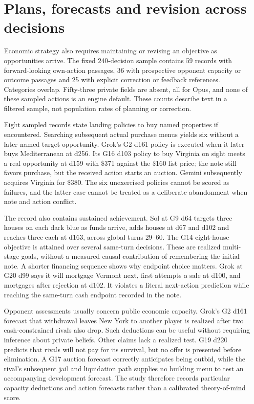 \section{Plans, forecasts and revision across decisions}

Economic strategy also requires maintaining or revising an objective as opportunities arrive. The fixed 240-decision sample contains 59 records with forward-looking own-action passages, 36 with prospective opponent capacity or outcome passages and 25 with explicit correction or feedback references. Categories overlap. Fifty-three private fields are absent, all for Opus, and none of these sampled actions is an engine default. These counts describe text in a filtered sample, not population rates of planning or correction.

Eight sampled records state landing policies to buy named properties if encountered. Searching subsequent actual purchase menus yields six without a later named-target opportunity. Grok's G2 d161 policy is executed when it later buys Mediterranean at d256. Its G16 d103 policy to buy Virginia on sight meets a real opportunity at d159 with \$371 against the \$160 list price; the note still favors purchase, but the received action starts an auction. Gemini subsequently acquires Virginia for \$380. The six unexercised policies cannot be scored as failures, and the latter case cannot be treated as a deliberate abandonment when note and action conflict.

The record also contains sustained achievement. Sol at G9 d64 targets three houses on each dark blue as funds arrive, adds houses at d67 and d102 and reaches three each at d163, across global turns 29--60. The G14 eight-house objective is attained over several same-turn decisions. These are realized multi-stage goals, without a measured causal contribution of remembering the initial note. A shorter financing sequence shows why endpoint choice matters. Grok at G20 d99 says it will mortgage Vermont next, first attempts a sale at d100, and mortgages after rejection at d102. It violates a literal next-action prediction while reaching the same-turn cash endpoint recorded in the note.

Opponent assessments usually concern public economic capacity. Grok's G2 d161 forecast that withdrawal leaves New York to another player is realized after two cash-constrained rivals also drop. Such deductions can be useful without requiring inference about private beliefs. Other claims lack a realized test. G19 d220 predicts that rivals will not pay for its survival, but no offer is presented before elimination. A G17 auction forecast correctly anticipates being outbid, while the rival's subsequent jail and liquidation path supplies no building menu to test an accompanying development forecast. The study therefore records particular capacity deductions and action forecasts rather than a calibrated theory-of-mind score.

